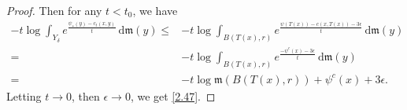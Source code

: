 \documentclass[10pt,a4paper]{amsart}
\renewcommand{\d}{{\mathrm d}}
\newcommand{\mm}{\mathfrak m}
\begin{document}
\begin{proof}
		Then for any $t<t_0$, we have
		\begin{equation}\label{2.48}
			\begin{aligned}
				-t\log\int_{Y_\delta} e^{\frac{\psi_*(y)-c_t(x,y)}{t}}\,\d\mm(y)
				\leq &-t\log\int_{B(T(x),r)} e^{\frac{\psi(T(x))-c(x,T(x))-3\epsilon}{t}}\,\d\mm(y)\\
				= &-t\log\int_{B(T(x),r)} e^{\frac{-\psi^c(x)-3\epsilon}{t}}\,\d\mm(y)\\
				=&-t\log\mm(B(T(x),r))+\psi^c(x)+3\epsilon.
			\end{aligned}
		\end{equation}
		Letting $t\rightarrow0$, then $\epsilon\rightarrow0$, we get \eqref{2.47}.
		
		
	\end{proof}
\end{document}
